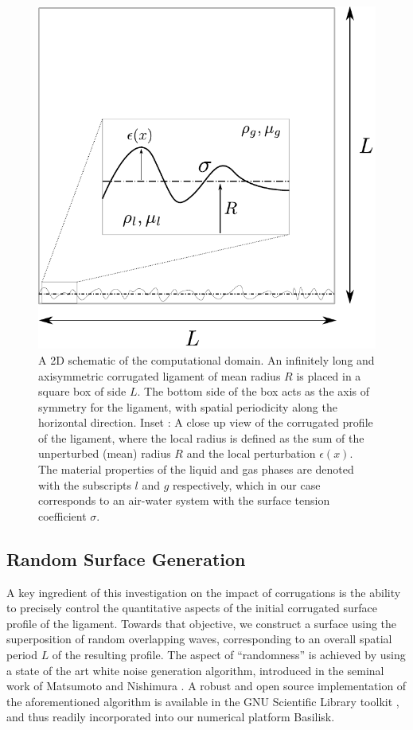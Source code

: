\begin{figure}
\centering
\includegraphics{plots/ligament_breakup/schematic.pdf}
\caption{ A 2D schematic of the computational domain.
An infinitely long and axisymmetric corrugated ligament
of mean radius $R$ is placed in a square box of side $L$.
The bottom side of the box acts as the axis of symmetry 
for the ligament, with spatial periodicity along the horizontal 
direction. Inset : A close up view of the corrugated profile
of the ligament, where the local radius is defined as 
the sum of the unperturbed (mean) radius $R$ and the local 
perturbation $\epsilon(x)$. The material properties of the 
liquid and gas phases are denoted with the subscripts $l$ and $g$
respectively, which in our case corresponds to an air-water system
with the surface tension coefficient $\sigma$. 
}
\label{schematic}
\end{figure}

\subsection*{Random Surface Generation}

A key ingredient of this investigation on the impact 
of corrugations is the ability to precisely
control the quantitative aspects of the initial 
corrugated surface profile of the ligament. 
Towards that objective, we construct a surface 
using the superposition of random overlapping waves, 
corresponding to an overall spatial period $L$ of the resulting profile. 
The aspect of ``randomness'' is achieved by  
using a state of the art white noise generation algorithm,
introduced in the seminal work of Matsumoto and Nishimura .
A robust and open source implementation of the aforementioned algorithm 
is available in the GNU Scientific Library toolkit \cite{gnusl},
and thus readily incorporated into our numerical platform Basilisk.   

